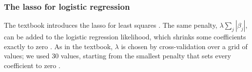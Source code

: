 \subsubsection{The lasso for logistic regression}
The textbook introduces the lasso for least squares \cite[Section 6.2.2, pp.~244--252]{James:2023}. The same penalty,
$\lambda\sum_j|\beta_j|$, can be added to the logistic regression likelihood, which shrinks some coefficients exactly to
zero \cite[Section 4.4.4, Eq.~(4.31), p.~125]{Hastie:2009}. As in the textbook, $\lambda$ is chosen by cross-validation over a
grid of values; we used 30 values, starting from the smallest penalty that sets every coefficient to zero
\cite[Section 2.5, p.~7]{Friedman:2010}.

